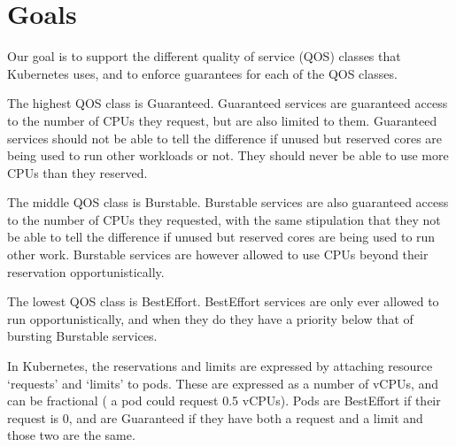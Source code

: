 \section{Goals}
\label{s:goals}


Our goal is to support the different quality of service (QOS) classes that
Kubernetes uses, and to enforce guarantees for each of the QOS classes.


The highest QOS class is Guaranteed. Guaranteed services are guaranteed access
to the number of CPUs they request, but are also limited to them. Guaranteed
services should not be able to tell the difference if unused but reserved cores
are being used to run other workloads or not. They should never be able to use
more CPUs than they reserved.

The middle QOS class is Burstable. Burstable services are also guaranteed access
to the number of CPUs they requested, with the same stipulation that they not be
able to tell the difference if unused but reserved cores are being used to run
other work. Burstable services are however allowed to use CPUs beyond their
reservation opportunistically.

The lowest QOS class is BestEffort. BestEffort services are only ever allowed to
run opportunistically, and when they do they have a priority below that of
bursting Burstable services.

In Kubernetes, the reservations and limits are expressed by attaching resource
`requests' and `limits' to pods. These are expressed as a number of vCPUs, and
can be fractional (\ie{} a pod could request 0.5 vCPUs). Pods are BestEffort if
their request is 0, and are Guaranteed if they have both a request and a limit
and those two are the same.

